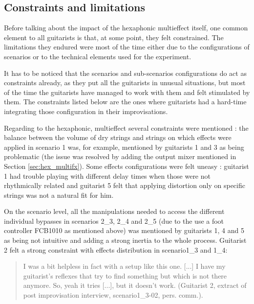 \documentclass{article}
\begin{document}

\subsection{Constraints and limitations}
Before talking about the impact of the hexaphonic multieffect itself, one common element to all guitarists is that, at some point, they felt constrained. The limitations they endured were most of the time either due to the configurations of scenarios or to the technical elements used for the experiment.

It has to be noticed that the scenarios and sub-scenarios configurations do act as constraints already, as they put all the guitarists in unusual situations, but most of the time the guitarists have managed to work with them and felt stimulated by them. The constraints listed below are the ones where guitarists had a hard-time integrating those configuration in their improvisations.

Regarding to the hexaphonic, multieffect several constraints were mentioned : the balance between the volume of dry strings and strings on which effects were applied in scenario 1 was, for example, mentioned by guitarists 1 and 3 as being problematic (the issue was resolved by adding the output mixer mentioned in Section \ref{sec:hex_multifx}). Some effects configurations were felt uneasy : guitarist 1 had trouble playing with different delay times when those were not rhythmically related and guitarist 5 felt that applying distortion only on specific strings was not a natural fit for him. 

On the scenario level, all the manipulations needed to access the different individual bypasses in scenarios 2\_3, 2\_4 and 2\_5 (due to the use a foot controller FCB1010 as mentioned above) was mentioned by guitarists 1, 4 and 5 as being not intuitive and adding a strong inertia to the whole process.
Guitarist 2 felt a strong constraint with effects distribution in scenario1\_3 and 1\_4:
    \begin{quote}
        I was a bit helpless in fact with a setup like this one. [...] I have my guitarist's reflexes that try to find something but which is not there anymore. So, yeah it tries [...], but it doesn't work. (Guitarist 2, extract of post improvisation interview, scenario1\_3-02, pers. comm.).
    \end{quote}
\end{document}
